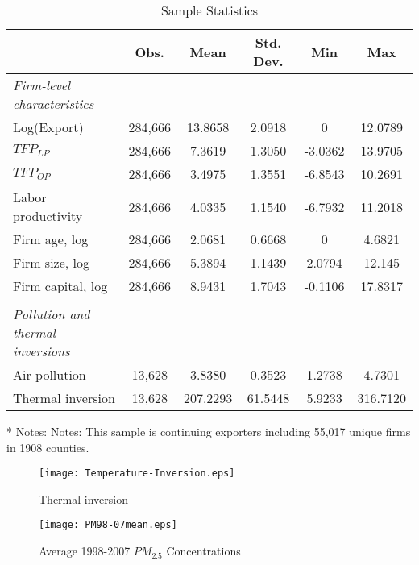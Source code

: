 \documentclass[12pt]{article}
\begin{document}
\begin{table}[H]\centering
  \caption{Sample Statistics}\label{tab:stat}
  \begin{tabular}{l*{5}{c}}
    \hline\hline
  &\multicolumn{1}{c}{Obs.}&\multicolumn{1}{c}{Mean}&\multicolumn{1}{c}{Std. Dev.}&\multicolumn{1}{c}{Min}&\multicolumn{1}{c}{Max}\\             
    \hline
    \textit{Firm-level characteristics} &&&&&\\
    Log(Export)	&284,666	&13.8658	&2.0918&0&12.0789\\
    $TFP_{LP}$	&284,666	&7.3619	&1.3050&-3.0362&13.9705\\
    $TFP_{OP}$	&284,666	&3.4975	&1.3551&-6.8543&10.2691\\
    Labor productivity  &284,666	&4.0335	&1.1540&-6.7932&11.2018\\
    Firm age, log 	&284,666	&2.0681 &0.6668&0&4.6821\\
    Firm size, log	&284,666	&5.3894	&1.1439&2.0794&12.145\\
    Firm capital, log &284,666	&8.9431&1.7043&-0.1106&17.8317\\
                       &&&&&\\
    \textit{Pollution and thermal inversions} &&&&&\\    
    Air pollution      &13,628	& 3.8380	&0.3523&1.2738&4.7301\\
    Thermal inversion	&13,628 &207.2293	&61.5448&5.9233&316.7120\\
    \hline\hline
  \end{tabular}

  \begin{tablenotes}
    \item[*] \small Notes: Notes: This sample is continuing exporters including 55,017 unique firms in 1908 counties.
  \end{tablenotes}
\end{table}

\begin{figure}[H]\centering 
  \caption{Thermal inversion\protect\footnotemark} \label{fig:1}
  \texttt{[image: Temperature-Inversion.eps]}
\end{figure}

\begin{figure}[H]\centering
  \caption{Average 1998-2007 $PM_{2.5}$ Concentrations}\label{fig:2}
  \texttt{[image: PM98-07mean.eps]}
\end{figure}
\end{document}
